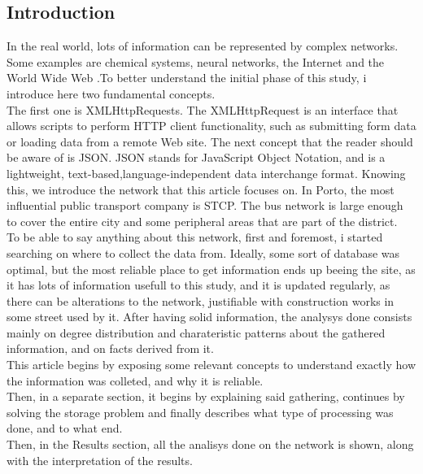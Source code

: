 \documentclass[12pt]{article}
\begin{document}
\begin{multicols}{2}
\section{Introduction}
In the real world, lots of information can be represented by complex networks. Some examples are chemical systems, neural networks, the Internet and the World Wide Web \cite{boccaletti2006complex}.To better understand the initial phase of this study, i introduce here two fundamental concepts.\\
The first one is XMLHttpRequests. The XMLHttpRequest is an interface that allows scripts to perform HTTP client functionality, such as submitting form data or loading data from a remote Web site\cite{van2007xmlhttprequest}.
The next concept that the reader should be aware of is JSON. JSON stands for JavaScript Object Notation, and is a lightweight, text-based,language-independent data interchange format\cite{crockford2006application}. Knowing this, we introduce the network that this article focuses on.
In Porto, the most influential public transport company is STCP. The bus network is large enough to cover the entire city and some peripheral areas that are part of the district.\\
To be able to say anything about this network, first and foremost, i started searching on where to collect the data from. Ideally, some sort of database was optimal, but the most reliable place to get information ends up beeing the site, as it has lots of information usefull to this study, and it is updated regularly, as there can be alterations to the network, justifiable with construction works in some street used by it.
After having solid information, the analysys done consists mainly on degree distribution and charateristic patterns about the gathered information, and on facts derived from it.\\
This article begins by exposing some relevant concepts to understand exactly how the information was colleted, and why it is reliable.\\
Then, in a separate section, it begins by explaining said gathering, continues by solving the storage problem and finally describes what type of processing was done, and to what end.\\
Then, in the Results section, all the analisys done on the network is shown, along with the interpretation of the results.


\end{multicols}
\end{document}

